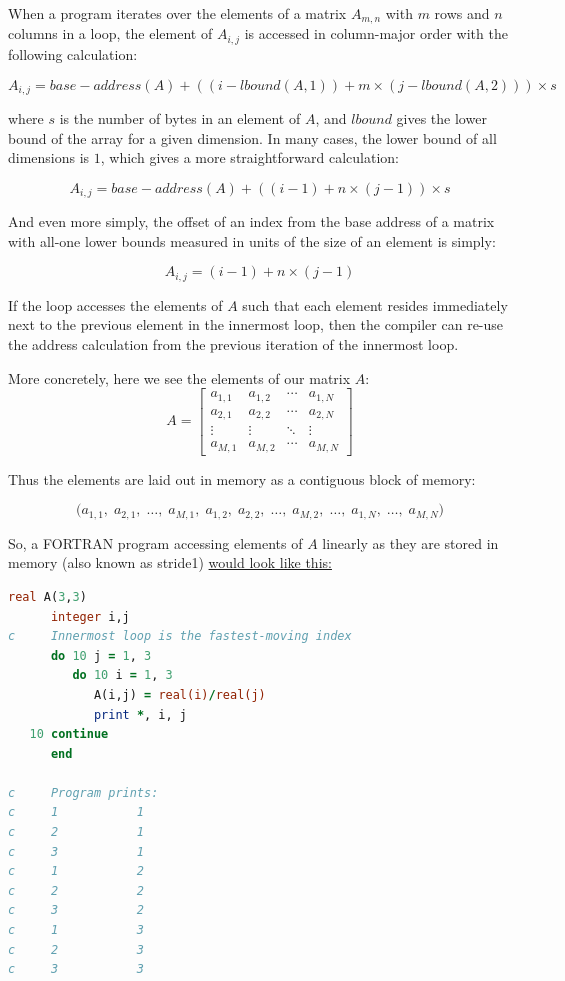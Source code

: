 When a program iterates over the elements of a matrix $A_{m, n}$ with $m$ rows and $n$ columns in a loop,
the element of $A_{i, j}$ is accessed in column-major order with the following calculation:

\[
	A_{i, j} = base-address(A) + ((i - lbound(A, 1)) + m \times (j - lbound(A, 2))) \times s
\]

where $s$ is the number of bytes in an element of $A$, and $lbound$ gives the lower bound of the array
for a given dimension.
In many cases, the lower bound of all dimensions is $1$, which gives a more straightforward calculation:

\[
	A_{i, j} = base-address(A) + ((i - 1) + n \times (j - 1)) \times s
\]

And even more simply, the offset of an index from the base address of a matrix
with all-one lower bounds measured in units of the size of an element is simply:

\[
	A_{i, j} = (i - 1) + n \times (j - 1)
\]

If the loop accesses the elements of $A$ such that each element resides immediately next to the previous
element in the innermost loop, then the compiler can re-use the address calculation from the previous
iteration of the innermost loop.

More concretely, here we see the elements of our matrix $A$:
\[
	A =
	\begin{bmatrix}
		a_{1,1} & a_{1,2} & \cdots & a_{1,N} \\
		a_{2,1} & a_{2,2} & \cdots & a_{2,N} \\
		\vdots  & \vdots  & \ddots & \vdots  \\
		a_{M,1} & a_{M,2} & \cdots & a_{M,N}
	\end{bmatrix}
\]

Thus the elements are laid out in memory as a contiguous block of memory:

\[
	\big(
	a_{1,1},\; a_{2,1},\; \dots,\; a_{M,1},\;
	a_{1,2},\; a_{2,2},\; \dots,\; a_{M,2},\;
	\ldots,\;
	a_{1,N},\; \dots,\; a_{M,N}
	\big)
\]

So, a FORTRAN program accessing elements of $A$ linearly as they
are stored in memory (also known as \gls{stride1})
\href{https://godbolt.org/z/T6M4dvMP4}{would look like this:}

\begin{lstlisting}[language=Fortran,frame=single]
      real A(3,3)
      integer i,j
c     Innermost loop is the fastest-moving index
      do 10 j = 1, 3
         do 10 i = 1, 3
            A(i,j) = real(i)/real(j)
            print *, i, j
   10 continue
      end

c     Program prints:
c     1           1
c     2           1
c     3           1
c     1           2
c     2           2
c     3           2
c     1           3
c     2           3
c     3           3
\end{lstlisting}

